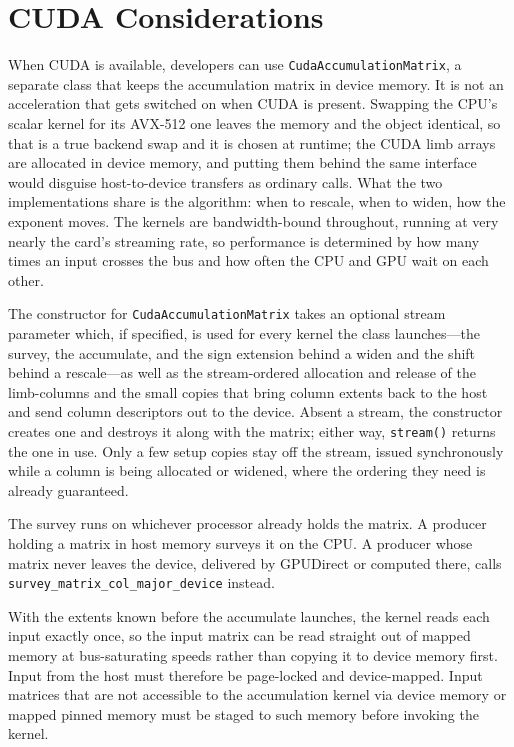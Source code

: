 \documentclass[acmsmall,screen,review]{acmart}
\newcommand{\code}[1]{\texttt{#1}}
\begin{document}
\section{CUDA Considerations}

When CUDA is available, developers can use \code{CudaAccumulationMatrix}, a separate class that keeps the accumulation matrix in device memory. It is not an acceleration that gets switched on when CUDA is present. Swapping the CPU's scalar kernel for its AVX-512 one leaves the memory and the object identical, so that is a true backend swap and it is chosen at runtime; the CUDA limb arrays are allocated in device memory, and putting them behind the same interface would disguise host-to-device transfers as ordinary calls. What the two implementations share is the algorithm: when to rescale, when to widen, how the exponent moves. The kernels are bandwidth-bound throughout, running at very nearly the card's streaming rate, so performance is determined by how many times an input crosses the bus and how often the CPU and GPU wait on each other.

The constructor for \code{CudaAccumulationMatrix} takes an optional stream parameter which, if specified, is used for every kernel the class launches---the survey, the accumulate, and the sign extension behind a widen and the shift behind a rescale---as well as the stream-ordered allocation and release of the limb-columns and the small copies that bring column extents back to the host and send column descriptors out to the device. Absent a stream, the constructor creates one and destroys it along with the matrix; either way, \code{stream()} returns the one in use. Only a few setup copies stay off the stream, issued synchronously while a column is being allocated or widened, where the ordering they need is already guaranteed.

The survey runs on whichever processor already holds the matrix. A producer holding a matrix in host memory surveys it on the CPU. A producer whose matrix never leaves the device, delivered by GPUDirect or computed there, calls \code{survey\_matrix\_col\_major\_device} instead.

With the extents known before the accumulate launches, the kernel reads each input exactly once, so the input matrix can be read straight out of mapped memory at bus-saturating speeds rather than copying it to device memory first. Input from the host must therefore be page-locked and device-mapped. Input matrices that are not accessible to the accumulation kernel via device memory or mapped pinned memory must be staged to such memory before invoking the kernel.
\end{document}

